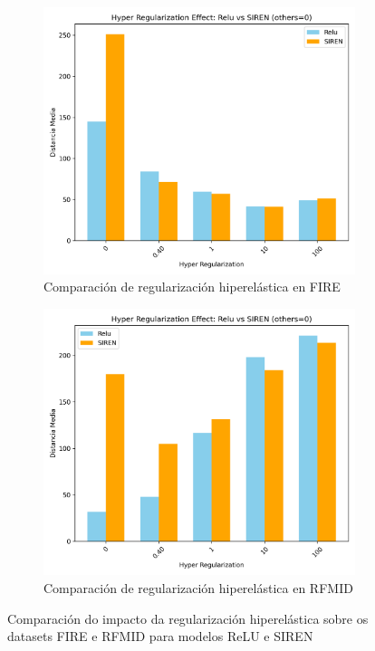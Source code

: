 \begin{figure}[ht]
    \centering
    \begin{subfigure}[b]{0.48\textwidth}
        \centering
        \includegraphics[width=\textwidth]{imaxes/reg_examples/barplot_hyper_reg_comparison_MLP_vs_SIREN_FIRE.png}
        \caption{Comparación de regularización hiperelástica en FIRE}
        \label{fig:barplot_hyper_reg_comparison_MLP_vs_SIREN_FIRE}
    \end{subfigure}\hfill
    \begin{subfigure}[b]{0.48\textwidth}
        \centering
        \includegraphics[width=\textwidth]{imaxes/reg_examples/barplot_hyper_reg_comparison_MLP_vs_SIREN_RFMID.png}
        \caption{Comparación de regularización hiperelástica en RFMID}
        \label{fig:barplot_hyper_reg_comparison_MLP_vs_SIREN_RFMID}
    \end{subfigure}
    \caption{Comparación do impacto da regularización hiperelástica sobre os datasets FIRE e RFMID para modelos ReLU e SIREN}
    \label{fig:barplot_hyper_reg_comparison}
\end{figure}

